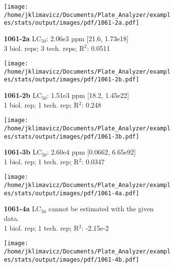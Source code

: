 \documentclass{article}
\begin{document}
\begin{figure}[thp!]
   \begin{subfigure}{0.500\textwidth}
      \centering
      \texttt{[image: /home/jklimavicz/Documents/Plate\_Analyzer/examples/stats/output/images/pdf/1061-2a.pdf]}
      \vspace{-0.05cm}
      \caption*{\textbf{1061-2a} LC$_{50}$: 2.06e3 ppm [21.6, 1.73e18] \\ 
3 biol. reps; 3 tech. reps; R$^2$: 0.0511}
      \vspace{0.1cm}
   \end{subfigure}%
   \begin{subfigure}{0.500\textwidth}
      \centering
      \texttt{[image: /home/jklimavicz/Documents/Plate\_Analyzer/examples/stats/output/images/pdf/1061-2b.pdf]}
      \vspace{-0.05cm}
      \caption*{\textbf{1061-2b} LC$_{50}$: 1.51e3 ppm [18.2, 1.45e22] \\ 
1 biol. rep; 1 tech. rep; R$^2$: 0.248}
      \vspace{0.1cm}
   \end{subfigure}%
\vspace{-0.1cm}
   \begin{subfigure}{0.500\textwidth}
      \centering
      \texttt{[image: /home/jklimavicz/Documents/Plate\_Analyzer/examples/stats/output/images/pdf/1061-3b.pdf]}
      \vspace{-0.05cm}
      \caption*{\textbf{1061-3b} LC$_{50}$: 2.60e4 ppm [0.0662, 6.65e92] \\ 
1 biol. rep; 1 tech. rep; R$^2$: 0.0347}
      \vspace{0.1cm}
   \end{subfigure}%
   \begin{subfigure}{0.500\textwidth}
      \centering
      \texttt{[image: /home/jklimavicz/Documents/Plate\_Analyzer/examples/stats/output/images/pdf/1061-4a.pdf]}
      \vspace{-0.05cm}
      \caption*{\textbf{1061-4a} LC$_{50}$ cannot be estimated with the given data. \\ 
1 biol. rep; 1 tech. rep; R$^2$: -2.15e-2}
      \vspace{0.1cm}
   \end{subfigure}%
\vspace{-0.1cm}
   \begin{subfigure}{0.500\textwidth}
      \centering
      \texttt{[image: /home/jklimavicz/Documents/Plate\_Analyzer/examples/stats/output/images/pdf/1061-4b.pdf]}

\end{subfigure}
\end{figure}
\end{document}
